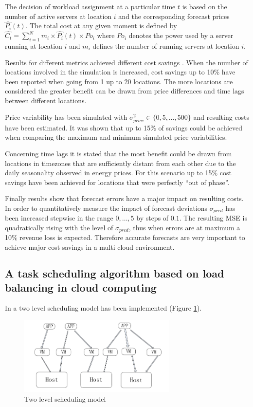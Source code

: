 The decision of workload assignment at a particular time $t$ is based on the number of active servers at location $i$ and the corresponding forecast prices $\hat{P_i}(t)$. The total cost at any given moment is defined by $\hat{C_t} = \sum_{i=1}^{N}{m_i \times \hat{P_i}(t) \times Po_i}$ where $Po_i$ denotes the power used by a server running at location $i$ and $m_i$ defines the number of running servers at location $i$. 

Results for different metrics achieved different cost savings \cite{de2013study}. When the number of locations involved in the simulation is increased, cost savings up to 10\% have been reported when going from 1 up to 20 locations. The more locations are considered the greater benefit can be drawn from price differences and time lags between different locations. 

Price variability has been simulated with $\sigma_{price}^{2} \in \{0,5,\ldots,500\}$ and resulting costs have been estimated. It was shown that up to 15\% of savings could be achieved when comparing the maximum and minimum simulated price variabilities. 

Concerning time lags it is stated that the most benefit could be drawn from locations in timezones that are sufficiently distant from each other due to the daily seasonality observed in energy prices. For this scenario up to 15\% cost savings have been achieved for locations that were perfectly "`out of phase"'. 

Finally results show that forecast errors have a major impact on resulting costs. In order to quantitatively measure the impact of forecast deviations $\sigma_{pred}$ has been increased stepwise in the range $0,\ldots,5$ by steps of $0.1$.
The resulting MSE is quadratically rising with the level of $\sigma_{pred}$, thus when errors are at maximum a 10\% revenue loss is expected. 
Therefore accurate forecasts are very important to achieve major cost savings in a multi cloud environment. 


\subsection{A task scheduling algorithm based on load balancing in cloud computing}

In \cite{fang2010task} a two level scheduling model has been implemented (Figure \ref{fig:two_level_resource_scheduling}). 

\begin{figure}[htbp]
	\centering
		\includegraphics[width=0.7\textwidth]{figures/state_of_the_art/two_level_resource_scheduling.PNG}
	\caption{Two level scheduling model \cite{fang2010task}}
	\label{fig:two_level_resource_scheduling}
\end{figure}

